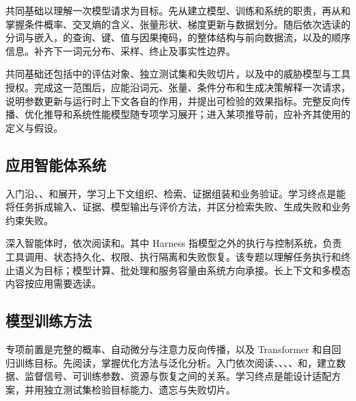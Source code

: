 共同基础以理解一次模型请求为目标。先从建立模型、训练和系统的职责，再从和掌握条件概率、交叉熵的含义、张量形状、梯度更新与数据划分。随后依次选读的分词与嵌入，的查询、键、值与因果掩码，的整体结构与前向数据流，以及的顺序信息。补齐下一词元分布、采样、终止及事实性边界。

共同基础还包括中的评估对象、独立测试集和失败切片，以及中的威胁模型与工具授权。完成这一范围后，应能沿词元、张量、条件分布和生成决策解释一次请求，说明参数更新与运行时上下文各自的作用，并提出可检验的效果指标。完整反向传播、优化推导和系统性能模型随专项学习展开；进入某项推导前，应补齐其使用的定义与假设。

\subsection*{应用智能体系统}
入门沿、、和展开，学习上下文组织、检索、证据组装和业务验证。学习终点是能将任务拆成输入、证据、模型输出与评价方法，并区分检索失败、生成失败和业务约束失败。

深入智能体时，依次阅读和。其中 Harness 指模型之外的执行与控制系统，负责工具调用、状态持久化、权限、执行隔离和失败恢复。该专题以理解任务执行和终止语义为目标；模型计算、批处理和服务容量由系统方向承接。长上下文和多模态内容按应用需要选读。

\subsection*{模型训练方法}
专项前置是完整的概率、自动微分与注意力反向传播，以及 Transformer 和自回归训练目标。先阅读，掌握优化方法与泛化分析。入门依次阅读、、、、和，建立数据、监督信号、可训练参数、资源与恢复之间的关系。学习终点是能设计适配方案，并用独立测试集检验目标能力、遗忘与失败切片。

